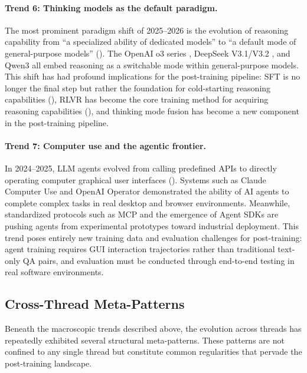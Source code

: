 \paragraph{Trend 6: Thinking models as the default paradigm.}
The most prominent paradigm shift of 2025--2026 is the evolution of reasoning capability
from ``a specialized ability of dedicated models'' to ``a default mode of general-purpose models'' ().
The OpenAI o3 series \cite{openai2025o3}, DeepSeek V3.1/V3.2 \cite{deepseek2025v32},
and Qwen3 \cite{yang2025qwen3}
all embed reasoning as a switchable mode within general-purpose models.
This shift has had profound implications for the post-training pipeline:
SFT is no longer the final step but rather the foundation for cold-starting reasoning capabilities (),
RLVR has become the core training method for acquiring reasoning capabilities (),
and thinking mode fusion has become a new component in the post-training pipeline.

\paragraph{Trend 7: Computer use and the agentic frontier.}
In 2024--2025, LLM agents evolved from calling predefined APIs
to directly operating computer graphical user interfaces ().
Systems such as Claude Computer Use \cite{anthropic2024computeruse}
and OpenAI Operator \cite{openai2025operator} demonstrated
the ability of AI agents to complete complex tasks in real desktop and browser environments.
Meanwhile, standardized protocols such as MCP \cite{anthropic2024mcp} and
the emergence of Agent SDKs are pushing agents from experimental prototypes toward industrial deployment.
This trend poses entirely new training data and evaluation challenges for post-training:
agent training requires GUI interaction trajectories rather than traditional text-only QA pairs,
and evaluation must be conducted through end-to-end testing in real software environments.

\subsection{Cross-Thread Meta-Patterns}
\label{sec:t8-meta}

Beneath the macroscopic trends described above,
the evolution across threads has repeatedly exhibited several structural meta-patterns.
These patterns are not confined to any single thread
but constitute common regularities that pervade the post-training landscape.

